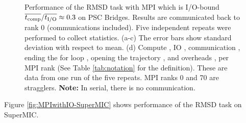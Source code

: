 \begin{figure}[ht!]
\caption{Performance of the RMSD task with MPI which is I/O-bound $\overline{{t}_{\text{comp}}}/\overline{{t}_{\text{I/O}}} \approx 0.3$ on PSC Bridges.
Results are communicated back to rank 0 (communications included). Five independent repeats were performed to collect statistics. (a-c) The error bars show
standard deviation with respect to mean. (d) Compute \tcomp, IO \tIO, communication \tcomm, ending the for loop ,
  opening the trajectory , and overheads ,  per MPI rank (See Table \ref{tab:notation} for the definition).
These are data from one run of the five repeats. MPI ranks 0 and 70 are stragglers. \textbf{Note:} In serial, there is no communication.}
\label{fig:MPIwithIO-Bridges}
\end{figure} 


Figure \ref{fig:MPIwithIO-SuperMIC} shows performance of the RMSD task on SuperMIC. 

